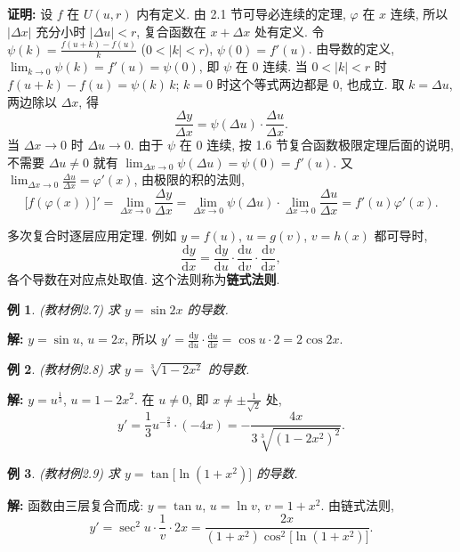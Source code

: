 \documentclass[UTF8,openany]{ctexbook}
\theoremstyle{chinesetextbook}
\newtheorem{example}{例}[section]
\newenvironment{cnproof}{\par\indent\textbf{证明:} \ignorespaces}{\par}
\newenvironment{cnsolution}{\par\indent\textbf{解:} \ignorespaces}{\par}
\newcommand{\dd}{\mathrm d}
\begin{document}
\begin{cnproof}
设 $f$ 在 $U(u,r)$ 内有定义. 由 2.1 节可导必连续的定理, $\varphi$ 在 $x$ 连续, 所以 $|\Delta x|$ 充分小时 $|\Delta u|<r$, 复合函数在 $x+\Delta x$ 处有定义. 令 $\displaystyle\psi(k)=\frac{f(u+k)-f(u)}k$ ($0<|k|<r$), $\psi(0)=f'(u)$. 由导数的定义, $\displaystyle\lim_{k\to0}\psi(k)=f'(u)=\psi(0)$, 即 $\psi$ 在 $0$ 连续. 当 $0<|k|<r$ 时 $f(u+k)-f(u)=\psi(k)\,k$; $k=0$ 时这个等式两边都是 $0$, 也成立. 取 $k=\Delta u$, 两边除以 $\Delta x$, 得
\[
\frac{\Delta y}{\Delta x}=\psi(\Delta u)\cdot\frac{\Delta u}{\Delta x}.
\]
当 $\Delta x\to0$ 时 $\Delta u\to0$. 由于 $\psi$ 在 $0$ 连续, 按 1.6 节复合函数极限定理后面的说明, 不需要 $\Delta u\ne0$ 就有 $\displaystyle\lim_{\Delta x\to0}\psi(\Delta u)=\psi(0)=f'(u)$. 又 $\displaystyle\lim_{\Delta x\to0}\frac{\Delta u}{\Delta x}=\varphi'(x)$, 由极限的积的法则,
\[
\bigl[f(\varphi(x))\bigr]'=\lim_{\Delta x\to0}\frac{\Delta y}{\Delta x}=\lim_{\Delta x\to0}\psi(\Delta u)\cdot\lim_{\Delta x\to0}\frac{\Delta u}{\Delta x}=f'(u)\varphi'(x).
\]
\end{cnproof}
多次复合时逐层应用定理. 例如 $y=f(u)$, $u=g(v)$, $v=h(x)$ 都可导时,
\[
\frac{\dd y}{\dd x}=\frac{\dd y}{\dd u}\cdot\frac{\dd u}{\dd v}\cdot\frac{\dd v}{\dd x},
\]
各个导数在对应点处取值. 这个法则称为\textbf{链式法则}.
\begin{example}\label{ex:c2-2-7}
\textnormal{(教材例2.7)} 求 $y=\sin2x$ 的导数.
\end{example}
\begin{cnsolution}
$y=\sin u$, $u=2x$, 所以 $\displaystyle y'=\frac{\dd y}{\dd u}\cdot\frac{\dd u}{\dd x}=\cos u\cdot2=2\cos2x$.
\end{cnsolution}
\begin{example}\label{ex:c2-2-8}
\textnormal{(教材例2.8)} 求 $y=\sqrt[3]{1-2x^2}$ 的导数.
\end{example}
\begin{cnsolution}
$y=u^{\frac13}$, $u=1-2x^2$. 在 $u\ne0$, 即 $\displaystyle x\ne\pm\frac1{\sqrt2}$ 处,
\[
y'=\frac13u^{-\frac23}\cdot(-4x)=-\frac{4x}{3\sqrt[3]{(1-2x^2)^2}}.
\]
\end{cnsolution}
\begin{example}\label{ex:c2-2-9}
\textnormal{(教材例2.9)} 求 $y=\tan\bigl[\ln(1+x^2)\bigr]$ 的导数.
\end{example}
\begin{cnsolution}
函数由三层复合而成: $y=\tan u$, $u=\ln v$, $v=1+x^2$. 由链式法则,
\[
y'=\sec^2u\cdot\frac1v\cdot2x=\frac{2x}{(1+x^2)\cos^2\bigl[\ln(1+x^2)\bigr]}.
\]
\end{cnsolution}
\end{document}
